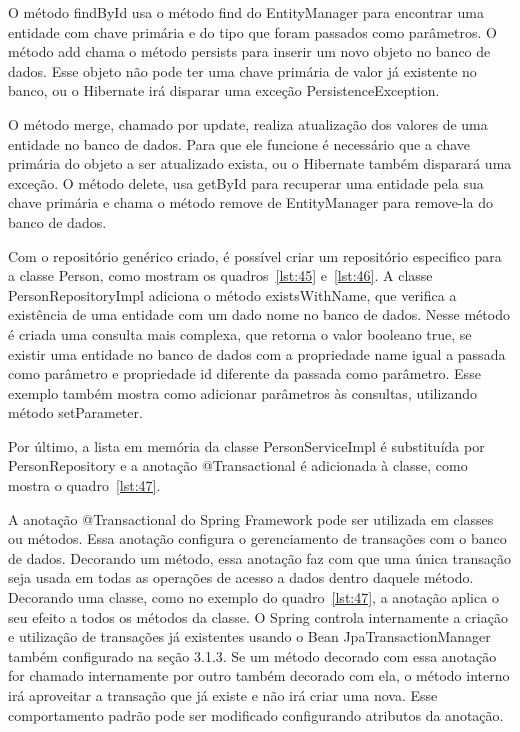 \documentclass[a4paper,12pt]{article}
\newcommand{\javacode}[3] {
	
}
\begin{document}
O método findById usa o método find do EntityManager para encontrar uma entidade com chave primária e do tipo que foram passados como parâmetros. O método add chama o método persists para inserir um novo objeto no banco de dados. Esse objeto não pode ter uma chave primária de valor já existente no banco, ou o Hibernate irá disparar uma exceção PersistenceException.

O método merge, chamado por update, realiza atualização dos valores de uma entidade no banco de dados. Para que ele funcione é necessário que a chave primária do objeto a ser atualizado exista, ou o Hibernate também disparará uma exceção. O método delete, usa getById para recuperar uma entidade pela sua chave primária e chama o método remove de EntityManager para remove-la do banco de dados.

Com o repositório genérico criado, é possível criar um repositório especifico para a classe Person, como mostram os quadros~\ref{lst:45} e~\ref{lst:46}. A classe PersonRepositoryImpl adiciona o método existsWithName, que verifica a existência de uma entidade com um dado nome no banco de dados. Nesse método é criada uma consulta mais complexa, que retorna o valor booleano true, se existir uma entidade no banco de dados com a propriedade name igual a passada como parâmetro e propriedade id diferente da passada como parâmetro. Esse exemplo também mostra como adicionar parâmetros às consultas, utilizando método setParameter.

\javacode{code/45.txt}{Interface PersonRepository}{lst:45}

\javacode{code/46.txt}{Classe PersonRepositoryImpl}{lst:46}

Por último, a lista em memória da classe PersonServiceImpl é substituída por PersonRepository e a anotação @Transactional é adicionada à classe, como mostra o quadro~\ref{lst:47}.

\javacode{code/47.txt}{PersonServiceImpl fazendo uso de PersonRepository}{lst:47}

A anotação @Transactional do Spring Framework pode ser utilizada em classes ou métodos. Essa anotação configura o gerenciamento de transações com o banco de dados. Decorando um método, essa anotação faz com que uma única transação seja usada em todas as operações de acesso a dados dentro daquele método. Decorando uma classe, como no exemplo do quadro~\ref{lst:47}, a anotação aplica o seu efeito a todos os métodos da classe.  O Spring controla internamente a criação e utilização de transações já existentes usando o Bean JpaTransactionManager também configurado na seção 3.1.3. Se um método decorado com essa anotação for chamado internamente por outro também decorado com ela, o método interno irá aproveitar a transação que já existe e não irá criar uma nova. Esse comportamento padrão pode ser modificado configurando atributos da anotação. 
\end{document}
